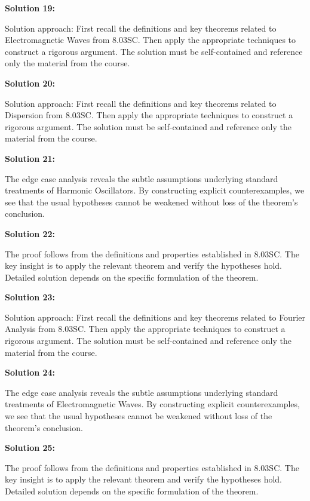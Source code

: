 \documentclass[12pt,a4paper]{exam}
\begin{document}
\vspace{0.5cm}

\textbf{Solution 19:}

Solution approach: First recall the definitions and key theorems related to Electromagnetic Waves from 8.03SC. Then apply the appropriate techniques to construct a rigorous argument. The solution must be self-contained and reference only the material from the course.

\vspace{0.5cm}

\textbf{Solution 20:}

Solution approach: First recall the definitions and key theorems related to Dispersion from 8.03SC. Then apply the appropriate techniques to construct a rigorous argument. The solution must be self-contained and reference only the material from the course.

\vspace{0.5cm}

\textbf{Solution 21:}

The edge case analysis reveals the subtle assumptions underlying standard treatments of Harmonic Oscillators. By constructing explicit counterexamples, we see that the usual hypotheses cannot be weakened without loss of the theorem's conclusion.

\vspace{0.5cm}

\textbf{Solution 22:}

The proof follows from the definitions and properties established in 8.03SC. The key insight is to apply the relevant theorem and verify the hypotheses hold. Detailed solution depends on the specific formulation of the theorem.

\vspace{0.5cm}

\textbf{Solution 23:}

Solution approach: First recall the definitions and key theorems related to Fourier Analysis from 8.03SC. Then apply the appropriate techniques to construct a rigorous argument. The solution must be self-contained and reference only the material from the course.

\vspace{0.5cm}

\textbf{Solution 24:}

The edge case analysis reveals the subtle assumptions underlying standard treatments of Electromagnetic Waves. By constructing explicit counterexamples, we see that the usual hypotheses cannot be weakened without loss of the theorem's conclusion.

\vspace{0.5cm}

\textbf{Solution 25:}

The proof follows from the definitions and properties established in 8.03SC. The key insight is to apply the relevant theorem and verify the hypotheses hold. Detailed solution depends on the specific formulation of the theorem.

\vspace{0.5cm}
\end{document}
